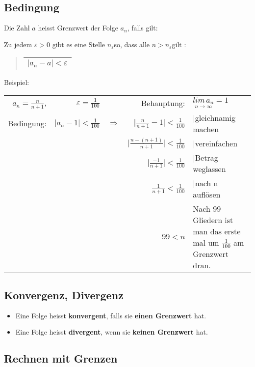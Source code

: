 \subsection*{Bedingung}

Die Zahl $a$ heisst Grenzwert der Folge $a_{n}$, falls gilt:

Zu jedem $\varepsilon>0$ gibt es eine Stelle $n_{\varepsilon}$so,
dass alle $n>n_{\varepsilon}$gilt :
\begin{verse}
\begin{tabular}{|c|}
\hline 
$\mid a_{n}-a\mid<\varepsilon$\tabularnewline
\hline 
\end{tabular}
\end{verse}
Beispiel:

\begin{tabular}{rrlrl}
$a_{n}=\frac{n}{n+1}$,  & $\varepsilon=\frac{1}{100}$ &  & Behauptung: & $\underset{n\rightarrow\infty}{lim\, a_{n}}=1$\tabularnewline
Bedingung: & $\mid a_{n}-1\mid<\frac{1}{100}$ & $\Rightarrow$ & $\mid\frac{n}{n+1}-1\mid<\frac{1}{100}$ & $\mid$gleichnamig machen\tabularnewline
 &  &  & $\mid\frac{n-(n+1)}{n+1}\mid<\frac{1}{100}$ & $\mid$vereinfachen\tabularnewline
 &  &  & $\mid\frac{-1}{n+1}\mid<\frac{1}{100}$ & $\mid$Betrag weglassen\tabularnewline
 &  &  & $\frac{1}{n+1}<\frac{1}{100}$ & $\mid$nach n auflösen\tabularnewline
 &  &  & $99<n$ & Nach 99 Gliedern ist man das erste mal um $\frac{1}{100}$ am Grenzwert
dran.\tabularnewline
\end{tabular}


\subsection*{Konvergenz, Divergenz}
\begin{itemize}
\item Eine Folge heisst \textbf{konvergent}, falls sie \textbf{einen Grenzwert}
hat.
\item Eine Folge heisst \textbf{divergent}, wenn sie \textbf{keinen Grenzwert}
hat.
\end{itemize}

\subsection*{Rechnen mit Grenzen}

